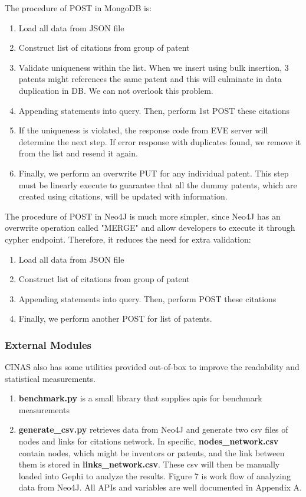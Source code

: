 \documentclass{sig-alternate}
\begin{document}
{The procedure of POST in MongoDB is:
\begin{enumerate}
 \item Load all data from JSON file
 \item Construct list of citations from group of patent
 \item Validate uniqueness within the list. When we insert using bulk insertion, 3 patents might references the same patent and this will culminate in data duplication in DB. We can not overlook this problem.
 \item Appending statements into query. Then, perform 1st POST these citations 
 \item If the uniqueness is violated, the response code from EVE server will determine the next step. If error response with duplicates found, we remove it from the list and resend it again.
 \item Finally, we perform an overwrite PUT for any individual patent. This step must be linearly execute to guarantee that all the dummy patents, which are created using citations, will be updated with information.
\end{enumerate}

The procedure of POST in Neo4J is much more simpler, since Neo4J has an overwrite operation called "MERGE" and allow developers to execute it through cypher endpoint. Therefore, it reduces the need for extra validation:
\begin{enumerate}
 \item Load all data from JSON file
 \item Construct list of citations from group of patent
 \item Appending statements into query. Then, perform POST these citations 
 \item Finally, we perform another POST for list of patents.
\end{enumerate}

\subsubsection{External Modules}
CINAS also has some utilities provided out-of-box to improve the readability and statistical measurements. 
\begin{enumerate}
 \item \textbf{benchmark.py} is a small library that supplies apis for benchmark measurements
 \item \textbf{generate\_csv.py} retrieves data from Neo4J and generate two csv files of nodes and links for citations network. In specific, \textbf{nodes\_network.csv} contain nodes, which might be inventors or patents, and the link between them is stored in \textbf{links\_network.csv}. These csv will then be manually loaded into Gephi to analyze the results. Figure 7 is work flow of analyzing data from Neo4J. All  APIs and variables are well documented in Appendix A.
 

\end{enumerate}}
\end{document}
